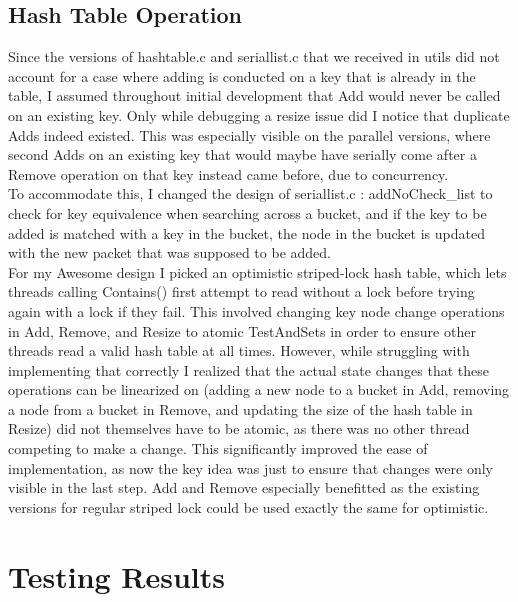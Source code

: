 \documentclass{article}
\begin{document}
\begin{adjustwidth}{-2cm}{-2cm}
\subsection{Hash Table Operation}
Since the versions of hashtable.c and seriallist.c that we received in utils did not account for a case where adding is conducted on a key that is already in the table, I assumed throughout initial development that Add would never be called on an existing key. Only while debugging a resize issue did I notice that duplicate Adds indeed existed. This was especially visible on the parallel versions, where second Adds on an existing key that would maybe have serially come after a Remove operation on that key instead came before, due to concurrency.\\
To accommodate this, I changed the design of seriallist.c : addNoCheck\_list to check for key equivalence when searching across a bucket, and if the key to be added is matched with a key in the bucket, the node in the bucket is updated with the new packet that was supposed to be added.\\
For my Awesome design I picked an optimistic striped-lock hash table, which lets threads calling Contains() first attempt to read without a lock before trying again with a lock if they fail. This involved changing key node change operations in Add, Remove, and Resize to atomic TestAndSets in order to ensure other threads read a valid hash table at all times. However, while struggling with implementing that correctly I realized that the actual state changes that these operations can be linearized on (adding a new node to a bucket in Add, removing a node from a bucket in Remove, and updating the size of the hash table in Resize) did not themselves have to be atomic, as there was no other thread competing to make a change. This significantly improved the ease of implementation, as now the key idea was just to ensure that changes were only visible in the last step. Add and Remove especially benefitted as the existing versions for regular striped lock could be used exactly the same for optimistic.

\section{Testing Results}

\end{adjustwidth}
\end{document}
